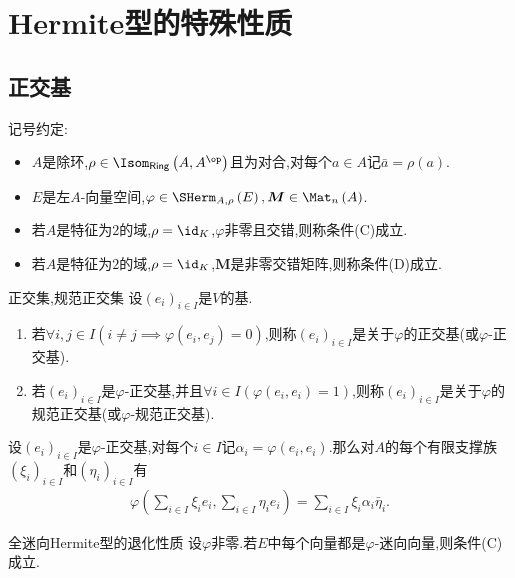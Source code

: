 \chapter{Hermite型的特殊性质}

\section{正交基}

记号约定:
\begin{itemize}
	\item $A$是除环,$\rho\in\Isom_{\mathsf{Ring}}\left(A,A^{\op}\right)$且为对合,对每个$a\in A$记$\bar{a}=\rho\left(a\right)$.
	\item $E$是左$A$-向量空间,$\varphi\in\SHerm_{A,\rho}\left(E\right),\boldsymbol{M}\in\Mat_{n}\left(A\right)$.
	\item 若$A$是特征为$2$的域,$\rho=\id_{K}$,$\varphi$非零且交错,则称条件(C)成立.
	\item 若$A$是特征为$2$的域,$\rho=\id_{K}$,$\boldsymbol{M}$是非零交错矩阵,则称条件(D)成立.
\end{itemize}

\begin{definition}{正交集,规范正交集}{}
	设$\left(e_{i}\right)_{i\in I}$是$V$的基.
	\begin{enumerate}
		\item 若$\forall i,j\in I\left(i\neq j\implies\varphi\left(e_{i},e_{j}\right)=0\right)$,则称$\left(e_{i}\right)_{i\in I}$是关于$\varphi$的正交基(或$\varphi$-正交基).
		\item 若$\left(e_{i}\right)_{i\in I}$是$\varphi$-正交基,并且$\forall i\in I\left(\varphi\left(e_{i},e_{i}\right)=1\right)$,则称$\left(e_{i}\right)_{i\in I}$是关于$\varphi$的规范正交基(或$\varphi$-规范正交基).
	\end{enumerate}
\end{definition}

\begin{remark}{}{}
	设$\left(e_{i}\right)_{i\in I}$是$\varphi$-正交基,对每个$i\in I$记$\alpha_{i}=\varphi\left(e_{i},e_{i}\right)$.那么对$A$的每个有限支撑族$\left(\xi_{i}\right)_{i\in I}$和$\left(\eta_{i}\right)_{i\in I}$有
	\begin{align*}
		\varphi\left(\sum\limits_{i\in I}\xi_{i}e_{i},\sum_{i\in I}\eta_{i}e_{i}\right)=\sum\limits_{i\in I}\xi_{i}\alpha_{i}\bar{\eta}_{i}.
	\end{align*}
\end{remark}

\begin{lemma}{全迷向Hermite型的退化性质}{}
	设$\varphi$非零.若$E$中每个向量都是$\varphi$-迷向向量,则条件(C)成立.
\end{lemma}

